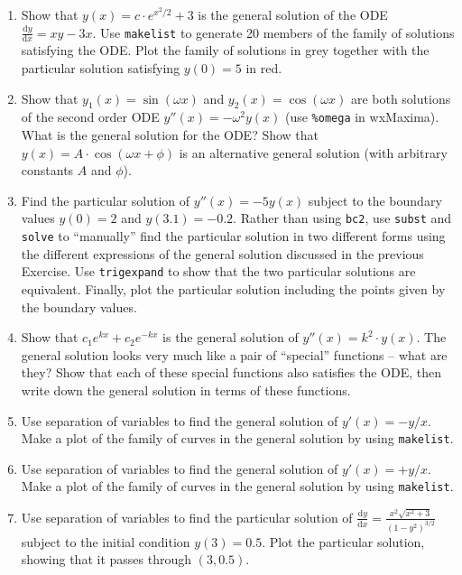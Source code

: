 \documentclass[10.5pt,twoside]{report}
\theoremstyle{definition}
\begin{document}
\begin{enumerate}

\item  Show that $y(x)=c\cdot e^{x^2/2} +3$ is the general solution of the ODE $\frac{\mathrm{d}y}{\mathrm{d}x}=xy-3x$.  Use \verb|makelist| to generate 20 members of the family of solutions satisfying the ODE.  Plot the family of solutions in grey together with the particular solution satisfying $y(0)=5$ in red.

\item  Show that $y_1(x)=\sin{(\omega x)}$ and $y_2(x)=\cos{(\omega x)}$ are both solutions of the second order ODE $y''(x)=-\omega^2 y(x)$ (use \verb|%omega| in wxMaxima).  What is the general solution for the ODE?  Show that $y(x)=A\cdot \cos(\omega x+\phi)$ is an alternative general solution (with arbitrary constants $A$ and $\phi$).  

\item  Find the particular solution of $y''(x)=-5 y(x)$ subject to the boundary values $y(0)=2$ and $y(3.1)=-0.2$.  Rather than using \verb|bc2|, use \verb|subst| and \verb|solve| to ``manually'' find the particular solution in two different forms using the different expressions of the general solution discussed in the previous Exercise. Use \verb|trigexpand| to show that the two particular solutions are equivalent.  Finally, plot the particular solution including the points given by the boundary values. 

\item  Show that $c_1 e^{kx}+c_2 e^{-kx}$ is the general solution of $y''(x)=k^2\cdot y(x)$.  The general solution looks very much like a pair of ``special'' functions -- what are they?  Show that each of these special functions also satisfies the ODE, then write down the general solution in terms of these functions.

\item  Use separation of variables to find the general solution of $y'(x)=-y/x$.  Make a plot of the family of curves in the general solution by using \verb|makelist|.

\item  Use separation of variables to find the general solution of $y'(x)=+y/x$.  Make a plot of the family of curves in the general solution by using \verb|makelist|.

\item  Use separation of variables to find the particular solution of $\frac{\mathrm{d}y}{\mathrm{d}x}=\frac{x^2 \sqrt{x^2+3}}{(1-y^2)^{3/2}}$ subject to the initial condition $y(3)=0.5$.  Plot the particular solution, showing that it passes through $(3,0.5)$.


\end{enumerate}
\end{document}

